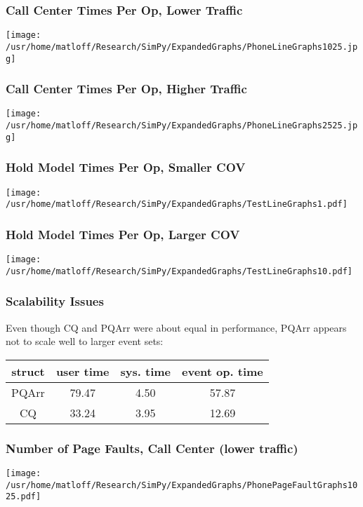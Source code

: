 \documentclass{beamer}
\begin{document}
\begin{frame}
\frametitle{Call Center Times Per Op, Lower Traffic}

\texttt{[image: /usr/home/matloff/Research/SimPy/ExpandedGraphs/PhoneLineGraphs1025.jpg]}

\end{frame}

\begin{frame}
\frametitle{Call Center Times Per Op, Higher Traffic}

\texttt{[image: /usr/home/matloff/Research/SimPy/ExpandedGraphs/PhoneLineGraphs2525.jpg]}

\end{frame}

\begin{frame}
\frametitle{Hold Model Times Per Op, Smaller COV}

\texttt{[image: /usr/home/matloff/Research/SimPy/ExpandedGraphs/TestLineGraphs1.pdf]} 
\end{frame}

\begin{frame}
\frametitle{Hold Model Times Per Op, Larger COV}

\texttt{[image: /usr/home/matloff/Research/SimPy/ExpandedGraphs/TestLineGraphs10.pdf]} 
\end{frame}

\begin{frame}
\frametitle{Scalability Issues}

\pause

Even though CQ and PQArr were about equal in performance, PQArr appears
not to scale well to larger event sets:

\pause

\vspace{0.3in}

\begin{tabular}{|c|c|c|c|}
\hline
struct & user time & sys. time  & event op. time  \\ \hline
PQArr & 79.47 &  4.50 & 57.87 \\ \pause 
CQ & 33.24 & 3.95 & 12.69 \\ 
\hline
\end{tabular}

\end{frame}

\begin{frame}
\frametitle{Number of Page Faults, Call Center (lower traffic)}

\texttt{[image: /usr/home/matloff/Research/SimPy/ExpandedGraphs/PhonePageFaultGraphs1025.pdf]}

\end{frame}
\end{document}
